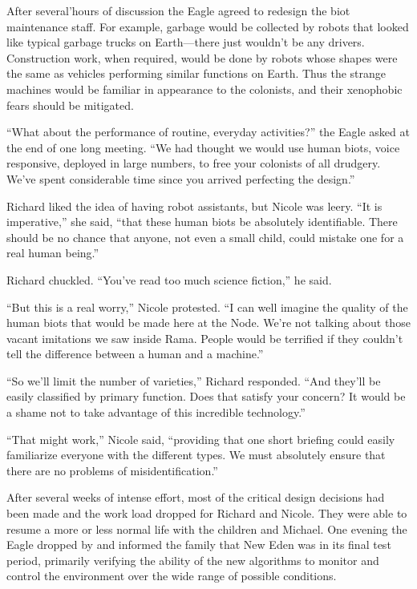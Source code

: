 \documentclass[]{article}
\begin{document}
{After several’hours of discussion the Eagle agreed to redesign the biot maintenance staff. For example, garbage would be collected by robots that looked like typical garbage trucks on Earth—there just wouldn’t be any drivers. Construction work, when required, would be done by robots whose shapes were the same as vehicles performing similar functions on Earth. Thus the strange machines would be familiar in appearance to the colonists, and their xenophobic fears should be mitigated.

“What about the performance of routine, everyday activities?” the Eagle asked at the end of one long meeting. “We had thought we would use human biots, voice responsive, deployed in large numbers, to free your colonists of all drudgery. We’ve spent considerable time since you arrived perfecting the design.”

Richard liked the idea of having robot assistants, but Nicole was leery. “It is imperative,” she said, “that these human biots be absolutely identifiable. There should be no chance that anyone, not even a small child, could mistake one for a real human being.”

Richard chuckled. “You’ve read too much science fiction,” he said.

“But this is a real worry,” Nicole protested. “I can well imagine the quality of the human biots that would be made here at the Node. We’re not talking about those vacant imitations we saw inside Rama. People would be terrified if they couldn’t tell the difference between a human and a machine.”

“So we’ll limit the number of varieties,” Richard responded. “And they’ll be easily classified by primary function. Does that satisfy your concern? It would be a shame not to take advantage of this incredible technology.”

“That might work,” Nicole said, “providing that one short briefing could easily familiarize everyone with the different types. We must absolutely ensure that there are no problems of misidentification.”

After several weeks of intense effort, most of the critical design decisions had been made and the work load dropped for Richard and Nicole. They were able to resume a more or less normal life with the children and Michael. One evening the Eagle dropped by and informed the family that New Eden was in its final test period, primarily verifying the ability of the new algorithms to monitor and control the environment over the wide range of possible conditions.

}
\end{document}
